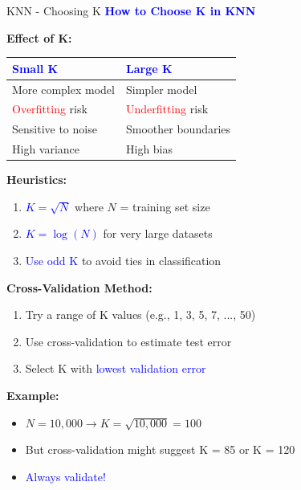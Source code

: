 \documentclass[8pt]{beamer}
\begin{document}
	\begin{frame}{KNN - Choosing K}
		\fontsize{6.5}{7.5}\selectfont
		\textcolor{blue}{\textbf{How to Choose K in KNN}}
		
		\textbf{Effect of K:}
		
		\begin{tabular}{|p{4cm}|p{4cm}|}
			\hline
			\textcolor{blue}{Small K} & \textcolor{blue}{Large K} \\
			\hline
			More complex model & Simpler model \\
			\hline
			\textcolor{red}{Overfitting} risk & \textcolor{red}{Underfitting} risk \\
			\hline
			Sensitive to noise & Smoother boundaries \\
			\hline
			High variance & High bias \\
			\hline
		\end{tabular}
		
		\textbf{Heuristics:}
		\begin{enumerate}
			\item \textcolor{blue}{$K = \sqrt{N}$} where $N$ = training set size
			\item \textcolor{blue}{$K = \log(N)$} for very large datasets
			\item \textcolor{blue}{Use odd K} to avoid ties in classification
		\end{enumerate}
		
		\textbf{Cross-Validation Method:}
		\begin{enumerate}
			\item Try a range of K values (e.g., 1, 3, 5, 7, ..., 50)
			\item Use cross-validation to estimate test error
			\item Select K with \textcolor{blue}{lowest validation error}
		\end{enumerate}
		
		\textbf{Example:}
		\begin{itemize}
			\item $N = 10,000 \rightarrow K = \sqrt{10,000} = 100$
			\item But cross-validation might suggest K = 85 or K = 120
			\item \textcolor{blue}{Always validate!}
		\end{itemize}
	\end{frame}
	
\end{document}
